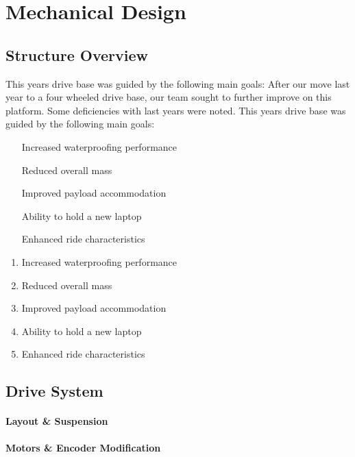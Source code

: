 \section{Mechanical Design}

\subsection{Structure Overview}

This years drive base was guided by the following main goals:
After our move last year to a four wheeled drive base, our team sought to further improve on this platform. Some deficiencies with last years were noted. This years drive base was guided by the following main goals:

\begin{itemize}
\item[Increased waterproofing performance]
\item[Reduced overall mass]
\item[Improved payload accommodation]
\item[Ability to hold a new laptop]
\item[Enhanced ride characteristics]
\end{itemize}
\begin{enumerate}
\item Increased waterproofing performance
\item Reduced overall mass
\item Improved payload accommodation
\item Ability to hold a new laptop
\item Enhanced ride characteristics
\end{enumerate}

\subsection{Drive System}
\paragraph{Layout \& Suspension}

\paragraph{Motors \& Encoder Modification}

